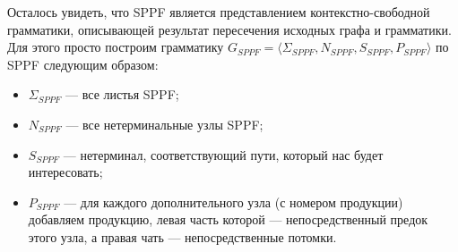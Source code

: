     Осталось увидеть, что SPPF является представлением контекстно-свободной грамматики, описывающей результат пересечения исходных графа и грамматики. Для этого просто построим грамматику $G_{\textit{SPPF}} = \langle \Sigma_{\textit{SPPF}}, N_{\textit{SPPF}}, S_{\textit{SPPF}}, P_{\textit{SPPF}}\rangle$ по SPPF следующим образом:
    \begin{itemize}
      \item $\Sigma_{\textit{SPPF}}$ --- все листья SPPF;
      \item $N_{\textit{SPPF}}$ --- все нетерминальные узлы SPPF;
      \item $S_{\textit{SPPF}}$ --- нетерминал, соответствующий пути, который нас будет интересовать;
      \item $P_{\textit{SPPF}}$ --- для каждого дополнительного узла (с номером продукции) добавляем продукцию, левая часть которой --- непосредственный предок этого узла, а правая чать --- непосредственные потомки.
    \end{itemize}

